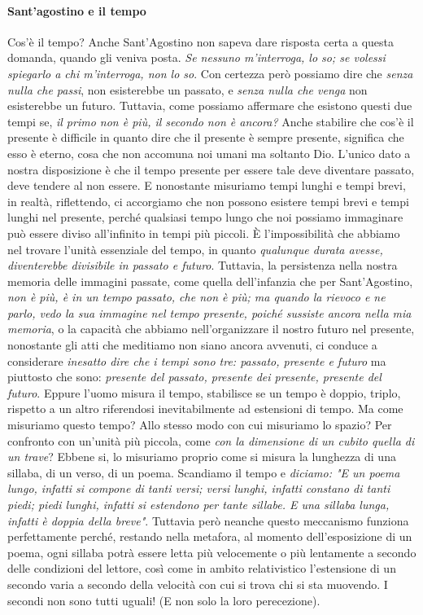\documentclass[a4paper,12pt]{report}
\begin{document}
\paragraph{Sant'agostino e il tempo}
Cos’è il tempo? Anche Sant’Agostino non sapeva dare risposta certa a questa domanda, quando gli veniva posta. \textit{Se nessuno m’interroga, lo so; se volessi spiegarlo a chi m’interroga, non lo so}. Con certezza però possiamo dire che \textit{senza nulla che passi}, non esisterebbe un passato, e \textit{senza nulla che venga} non esisterebbe un futuro. Tuttavia, come possiamo affermare che esistono questi due tempi se, \textit{il primo non è più, il secondo non è ancora?} Anche stabilire che cos’è il presente è difficile in quanto dire che il presente è sempre presente, significa che esso è eterno, cosa che non accomuna noi umani ma soltanto Dio. L’unico dato a nostra disposizione è che il tempo presente per essere tale deve diventare passato, deve tendere al non essere.
E nonostante misuriamo tempi lunghi e tempi brevi, in realtà, riflettendo, ci accorgiamo che non possono esistere tempi brevi e tempi lunghi nel presente, perché qualsiasi tempo lungo che noi possiamo immaginare può essere diviso all’infinito in tempi più piccoli. È l’impossibilità che abbiamo nel trovare l’unità essenziale del tempo, in quanto \textit{qualunque durata avesse, diventerebbe divisibile in passato e futuro}.
Tuttavia, la persistenza nella nostra memoria delle immagini passate, come quella dell’infanzia che per Sant’Agostino, \textit{non è più, è in un tempo passato, che non è più; ma quando la rievoco e ne parlo, vedo la sua immagine nel tempo presente, poiché sussiste ancora nella mia memoria}, o la capacità che abbiamo nell’organizzare il nostro futuro nel presente, nonostante gli atti che meditiamo non siano ancora avvenuti, ci conduce a considerare \textit{inesatto dire che i tempi sono tre: passato, presente e futuro} ma piuttosto che sono: \textit{presente del passato, presente dei presente, presente del futuro}.
Eppure l’uomo misura il tempo, stabilisce se un tempo è doppio, triplo, rispetto a un altro riferendosi inevitabilmente ad estensioni di tempo.
Ma come misuriamo questo tempo? Allo stesso modo con cui misuriamo lo spazio? Per confronto con un’unità più piccola, come \textit{con la dimensione di un cubito quella di un trave}? Ebbene si, lo misuriamo proprio come si misura la lunghezza di una sillaba, di un verso, di un poema. Scandiamo il tempo e \textit{diciamo: "E un poema lungo, infatti si compone di tanti versi; versi lunghi, infatti constano di tanti piedi; piedi lunghi, infatti si estendono per tante sillabe. E una sillaba lunga, infatti è doppia della breve"}. Tuttavia però neanche questo meccanismo funziona perfettamente perché, restando nella metafora, al momento dell’esposizione di un poema, ogni sillaba potrà essere letta più velocemente o più lentamente a secondo delle condizioni del lettore, così come in ambito relativistico l’estensione di un secondo varia a secondo della velocità con cui si trova chi si sta muovendo. I secondi non sono tutti uguali! (E non solo la loro perecezione).
\end{document}
